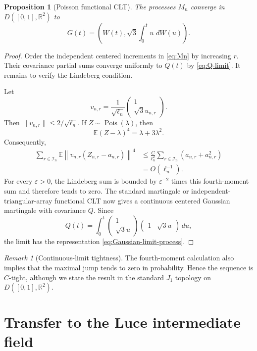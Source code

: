 \documentclass[11pt]{article}
\newtheorem{proposition}[theorem]{Proposition}
\theoremstyle{definition}
\theoremstyle{remark}
\newtheorem{remark}[theorem]{Remark}
\newcommand{\Ee}{\mathbb E}
\newcommand{\dd}{\,d}
\newcommand{\Pois}{\operatorname{Pois}}
\newcommand{\cI}{\mathcal I}
\newcommand{\R}{\mathbb R}
\begin{document}
\begin{proposition}[Poisson functional CLT]
\label{prop:Poisson-FCLT}
The processes $M_n$ converge in $D([0,1],\R^2)$ to
\begin{equation}\label{eq:Gaussian-limit-process}
 G(t)=\left(W(t),\sqrt3\int_0^t u\,\dd W(u)\right).
\end{equation}
\end{proposition}

\begin{proof}
Order the independent centered increments in \eqref{eq:Mn} by increasing
$r$.  Their covariance partial sums converge uniformly to $Q(t)$ by
\eqref{eq:Q-limit}.  It remains to verify the Lindeberg condition.

Let
\[
 v_{n,r}=\frac1{\sqrt{\ell_n}}
 \begin{pmatrix}1\\ \sqrt3u_{n,r}\end{pmatrix}.
\]
Then $\|v_{n,r}\|\le2/\sqrt{\ell_n}$.  If
$Z\sim\Pois(\lambda)$, then
\[
 \Ee(Z-\lambda)^4=\lambda+3\lambda^2.
\]
Consequently,
\begin{align*}
 \sum_{r\in\cI_n}
 \Ee\left\|v_{n,r}(Z_{n,r}-a_{n,r})\right\|^4
 &\le\frac{C}{\ell_n^2}
 \sum_{r\in\cI_n}(a_{n,r}+a_{n,r}^2)\\
 &=O(\ell_n^{-1}).
\end{align*}
For every $\varepsilon>0$, the Lindeberg sum is bounded by
$\varepsilon^{-2}$ times this fourth-moment sum and therefore tends to zero.
The standard martingale or independent-triangular-array functional CLT now
gives a continuous centered Gaussian martingale with covariance $Q$.
Since
\[
 Q(t)=\int_0^t
 \begin{pmatrix}1\\ \sqrt3u\end{pmatrix}
 \begin{pmatrix}1&\sqrt3u\end{pmatrix}\dd u,
\]
the limit has the representation \eqref{eq:Gaussian-limit-process}.
\end{proof}

\begin{remark}[Continuous-limit tightness]
The fourth-moment calculation also implies that the maximal jump tends to
zero in probability.  Hence the sequence is $C$-tight, although we state the
result in the standard $J_1$ topology on $D([0,1],\R^2)$.
\end{remark}

\section{Transfer to the Luce intermediate field}
\end{document}
